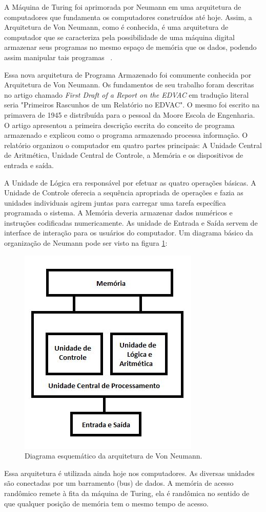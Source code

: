 \documentclass[12pt]{article}
\begin{document}
A Máquina de Turing foi aprimorada por Neumann em uma arquitetura de computadores que fundamenta os computadores construídos até hoje. Assim, a Arquitetura de Von Neumann, como é conhecida, é uma arquitetura de computador que se caracteriza pela possibilidade de uma máquina digital armazenar seus programas no mesmo espaço de memória que os dados, podendo assim manipular tais programas ~\cite{vonneumann}.

Essa nova arquitetura de Programa Armazenado foi comumente conhecida por Arquitetura de Von Neumann. Os fundamentos de seu trabalho foram descritas no artigo chamado \emph{First Draft of a Report on the EDVAC} \cite{von1945} em tradução literal seria "Primeiros Rascunhos de um Relatório no EDVAC". O mesmo foi escrito na primavera de 1945 e distribuída para o pessoal da Moore Escola de Engenharia. O artigo apresentou a primeira descrição escrita do conceito de programa armazenado e explicou como o programa armazenado processa informação.
O relatório organizou o computador em quatro partes principais: A Unidade Central de Aritmética, Unidade Central de Controle, a Memória e os dispositivos de entrada e saída.

A Unidade de Lógica era responsável por efetuar as quatro operações básicas. A Unidade de Controle oferecia a sequência apropriada de operações e fazia as unidades individuais agirem juntas para carregar uma tarefa específica programada o sistema. A Memória deveria armazenar dados numéricos e instruções codificadas numericamente. As unidade de Entrada e Saída servem de interface de interação para os usuários do computador.
Um diagrama básico da organização de Neumann pode ser visto na figura \ref{fig:exampleFig2}:


\begin{figure}[!ht]
\centering
\includegraphics[width=.3\textwidth]{fig2.jpg}
\caption{Diagrama esquemático da arquitetura de Von Neumann.}
\label{fig:exampleFig2}
\end{figure}

Essa arquitetura é utilizada ainda hoje nos computadores. As diversas unidades são conectadas por um barramento (bus) de dados. A memória de acesso randômico remete à fita da máquina de Turing, ela é randômica no sentido de que qualquer posição de memória tem o mesmo tempo de acesso.
\end{document}
